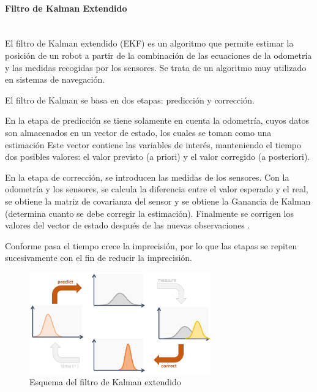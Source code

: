 \paragraph{Filtro de Kalman Extendido} \hspace{0pt} \\
El filtro de Kalman extendido (EKF) es un algoritmo que permite estimar la
posición de un robot a partir de la combinación de las ecuaciones de la
odometría y las medidas recogidas por los sensores. Se trata de un algoritmo muy
utilizado en sistemas de navegación.

El filtro de Kalman se basa en dos etapas: predicción y corrección.

En la etapa de predicción se tiene solamente en cuenta la odometría, cuyos datos
son almacenados en un vector de estado, los cuales se toman como una estimación
Este vector contiene las variables de interés, manteniendo el tiempo dos
posibles valores: el valor previsto (a priori) y el valor corregido (a
posteriori).

En la etapa de corrección, se introducen las medidas de los sensores. Con  la
odometría y los sensores, se calcula la diferencia entre el valor esperado y el
real, se obtiene la matriz de covarianza del sensor y se obtiene la Ganancia de
Kalman (determina cuanto se debe corregir la estimación). Finalmente se corrigen
los valores del vector de estado después de las nuevas observaciones \cite{EKF}.

Conforme pasa el tiempo crece la imprecisión, por lo que las etapas se repiten
sucesivamente con el fin de reducir la imprecisión.

\begin{figure}[!th]
  \begin{center}
    \includegraphics[width=0.7\textwidth]{images/cap2/Kalman.eps}
    \caption{Esquema del filtro de Kalman extendido}
    \label{fig:Kalman}
  \end{center}
\end{figure}

